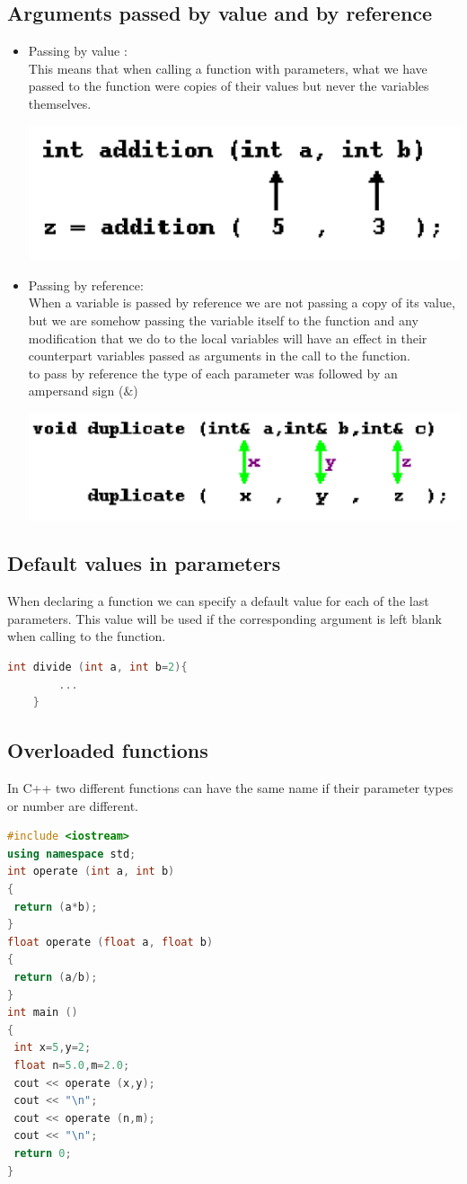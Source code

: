 \documentclass[12pt,oneside]{book}
\begin{document}
\subsection{Arguments passed by value and by reference}
\begin{itemize}
	\item Passing by value :\\
	      This means that when calling a function with parameters, what we have passed to the function were copies of their values but never the variables themselves.
	      \begin{center}
		      \includegraphics[width=0.3\linewidth]{../pic/3316/24.png}
	      \end{center}
	\item Passing by reference:\\
	      When a variable is passed by reference we are not passing a copy of its value, but we are somehow passing the
	      variable itself to the function and any modification that we do to the local variables will have an effect in their
	      counterpart variables passed as arguments in the call to the function. \\
	      to pass by reference the type of each parameter was followed by an ampersand sign ($\&$)
	      \begin{center}
		      \includegraphics[width=0.3\linewidth]{../pic/3316/23.png}
	      \end{center}
\end{itemize}
\subsection{Default values in parameters}
When declaring a function we can specify a default value for each of the last parameters. This value will be used if the corresponding argument is left blank when calling to the function.
	\begin{lstlisting}[language=C++]
    int divide (int a, int b=2){
        ...
    }
\end{lstlisting}
\subsection{Overloaded functions}
In C++ two different functions can have the same name if their parameter types or number are different.
	\begin{lstlisting}[language=C++]
#include <iostream>
using namespace std; 
int operate (int a, int b) 
{ 
 return (a*b); 
} 
float operate (float a, float b) 
{ 
 return (a/b); 
} 
int main () 
{ 
 int x=5,y=2; 
 float n=5.0,m=2.0; 
 cout << operate (x,y); 
 cout << "\n"; 
 cout << operate (n,m); 
 cout << "\n"; 
 return 0; 
} 
\end{lstlisting}
\end{document}
